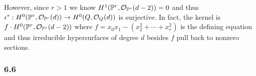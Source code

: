 \documentclass[12pt]{article}
\begin{document}
\begin{enumerate}
\begin{center}
\end{center}
However, since $r > 1$ we know $H^1(\mathbb{P}^r, \mathcal{O}_{\mathbb{P}^r}(d-2)) = 0$ and thus $\iota^* : H^0(\mathbb{P}^r, \mathcal{O}_{\mathbb{P}^r}(d)) \to H^0(Q, \mathcal{O}_{Q}(d))$ is surjective. In fact, the kernel is $f \cdot H^0(\mathbb{P}^r, \mathcal{O}_{\mathbb{P}^r}(d-2))$ where $f = x_0 x_1 - (x_2^2 + \cdots + x_r^2)$ is the defining equation and thus irreducible hypersurfaces of degree $d$ besides $f$ pull back to nonzero sections.
\end{enumerate}

\subsubsection{6.6}
\end{document}
